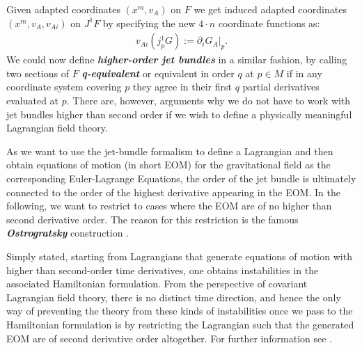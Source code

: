 Given adapted coordinates $(x^m,v_A)$ on $F$ we get induced adapted coordinates $(x^m, v_A, v_{Ai})$ on $J^1F$ by specifying the new $4 \cdot n$ coordinate functions as: 
\begin{align}
v_{Ai}(j^1_pG) := \partial_iG_A \big \vert_p.
\end{align}
We could now define \textit{\textbf{higher-order jet bundles}} in a similar fashion, by calling two sections of $F$ \textit{\textbf{q-equivalent}} or equivalent in order $q$ at $p \in M$ if in any coordinate system covering $p$ they agree in their first $q$ partial derivatives evaluated at $p$. There are, however, arguments why we do not have to work with jet bundles higher than second order if we wish to define a physically meaningful Lagrangian field theory.

As we want to use the jet-bundle formalism to define a Lagrangian and then obtain equations of motion (in short EOM) for the gravitational field as the corresponding Euler-Lagrange Equations, the order of the jet bundle is ultimately connected to the order of the highest derivative appearing in the EOM. In the following, we want to restrict to cases where the EOM are of no higher than second derivative order. The reason for this restriction is the famous \textbf{\textit{Ostrogratsky}} construction \cite{Ostrogradsky:1850fid}. 

Simply stated, starting from Lagrangians that generate equations of motion with higher than second-order time derivatives, one obtains instabilities in the associated Hamiltonian formulation. From the perspective of covariant Lagrangian field theory, there is no distinct time direction, and hence the only way of preventing the theory from these kinds of instabilities once we pass to the Hamiltonian formulation is by restricting the Lagrangian such that the generated EOM are of second derivative order altogether. For further information see \cite{2015arXiv150602210W}. 

